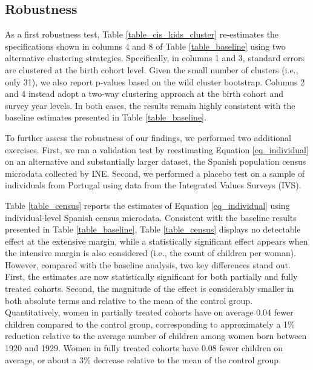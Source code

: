 \documentclass[a4paper,oneside,final,onecolumn,12pt,english]{article}
\begin{document}
\subsection{Robustness} \label{robustness}

As a first robustness test, Table \ref{table_cis_kids_cluster} re-estimates the specifications shown in columns 4 and 8 of Table \ref{table_baseline} using two alternative clustering strategies. Specifically, in columns 1 and 3, standard errors are clustered at the birth cohort level. Given the small number of clusters (i.e., only 31), we also report p-values based on the wild cluster bootstrap. Columns 2 and 4 instead adopt a two-way clustering approach at the birth cohort and survey year levels. In both cases, the results remain highly consistent with the baseline estimates presented in Table \ref{table_baseline}. 

To further assess the robustness of our findings, we performed two additional exercises. First, we ran a validation test by reestimating Equation \ref{eq_individual} on an alternative and substantially larger dataset, the Spanish population census microdata collected by INE. Second, we performed a placebo test on a sample of individuals from Portugal using data from the Integrated Values Surveys (IVS).%

Table \ref{table_census} reports the estimates of Equation \ref{eq_individual} using individual-level Spanish census microdata. Consistent with the baseline results presented in Table \ref{table_baseline}, Table \ref{table_census} displays no detectable effect at the extensive margin, while a statistically significant effect appears when the intensive margin is also considered (i.e., the count of children per woman).  However, compared with the baseline analysis, two key differences stand out. First, the estimates are now statistically significant for both partially and fully treated cohorts. Second, the magnitude of the effect is considerably smaller in both absolute terms and relative to the mean of the control group. %
Quantitatively, women in partially treated cohorts have on average 0.04 fewer children compared to the control group, corresponding to approximately a 1\% reduction relative to the average number of children among women born between 1920 and 1929. Women in fully treated cohorts have 0.08 fewer children on average, or about a 3\% decrease relative to the mean of the control group.
\end{document}
